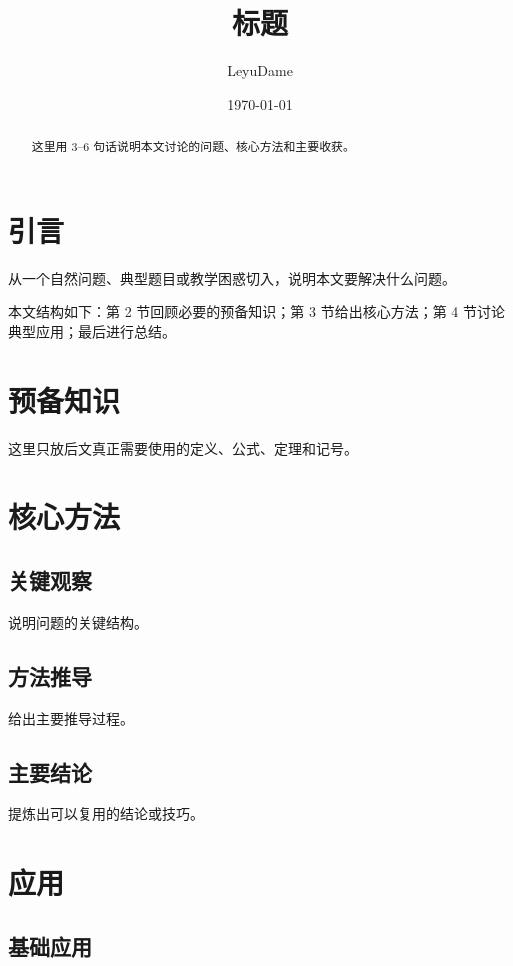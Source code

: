 \documentclass[10pt,a4paper,fontset=fandol]{ctexart}
\title{标题}
\author{LeyuDame}
\date{\today}
\begin{document}
\maketitle

\begin{abstract}
这里用 3--6 句话说明本文讨论的问题、核心方法和主要收获。
\end{abstract}

\section{引言}

从一个自然问题、典型题目或教学困惑切入，说明本文要解决什么问题。

本文结构如下：第 2 节回顾必要的预备知识；第 3 节给出核心方法；第 4 节讨论典型应用；最后进行总结。

\section{预备知识}

这里只放后文真正需要使用的定义、公式、定理和记号。

\section{核心方法}

\subsection{关键观察}

说明问题的关键结构。

\subsection{方法推导}

给出主要推导过程。

\subsection{主要结论}

提炼出可以复用的结论或技巧。

\section{应用}

\subsection{基础应用}
\end{document}
